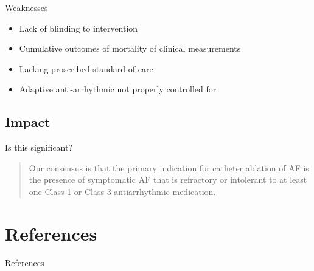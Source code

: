\documentclass[UKenglish]{beamer}
\begin{document}
\begin{frame}{Weaknesses}
    \begin{itemize}
        \item Lack of blinding to intervention
        \item Cumulative outcomes of mortality of clinical measurements
        \item Lacking proscribed standard of care  
        \item Adaptive anti-arrhythmic not properly controlled for
    \end{itemize}
\end{frame}

\subsection{Impact}

\begin{frame}{Is this significant?}
    
     \begin{quote}
        Our consensus is that the primary indication for catheter ablation of AF is the presence of symptomatic AF that is refractory or intolerant to at least one Class 1 or Class 3 antiarrhythmic medication.
    \end{quote}
    
\end{frame}



\section{References}


\begin{frame}[allowframebreaks]{References}

    \printbibliography
    
\end{frame}
\end{document}
